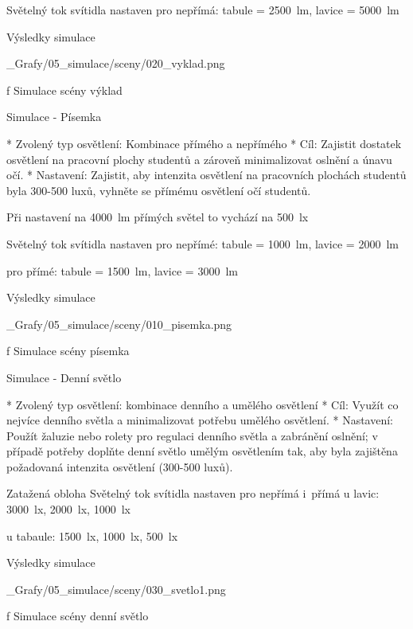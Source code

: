 \noindent Světelný tok svítidla nastaven pro nepřímá: tabule = 2500~lm, lavice = 5000~lm

\secc Výsledky simulace

\medskip {}
\picw=15cm _Grafy/05_simulace/sceny/020_vyklad.png
\caption/f Simulace scény výklad
\medskip

\sec Simulace - Písemka

\begitems
* Zvolený typ osvětlení: Kombinace přímého a nepřímého
* Cíl: Zajistit dostatek osvětlení na pracovní plochy studentů a zároveň minimalizovat oslnění a únavu očí.
* Nastavení: Zajistit, aby intenzita osvětlení na pracovních plochách studentů byla 300-500 luxů, vyhněte se přímému osvětlení očí studentů.
\enditems


\noindent Při nastavení na 4000~lm přímých světel to vychází na 500~lx

\noindent Světelný tok svítidla nastaven pro nepřímé: tabule = 1000~lm, lavice = 2000~lm

pro přímé: tabule = 1500~lm, lavice = 3000~lm

\secc Výsledky simulace

\medskip {}
\picw=15cm _Grafy/05_simulace/sceny/010_pisemka.png
\caption/f Simulace scény písemka
\medskip

\sec Simulace - Denní světlo

\begitems
* Zvolený typ osvětlení: kombinace denního a umělého osvětlení
* Cíl: Využít co nejvíce denního světla a minimalizovat potřebu umělého osvětlení.
* Nastavení: Použít žaluzie nebo rolety pro regulaci denního světla a zabránění oslnění; v případě potřeby doplňte denní světlo umělým osvětlením tak, aby byla zajištěna požadovaná intenzita osvětlení (300-500 luxů).
\enditems

\noindent Zatažená obloha
\noindent Světelný tok svítidla nastaven pro nepřímá i~přímá u lavic: 3000~lx, 2000~lx, 1000~lx

u tabaule: 1500~lx, 1000~lx, 500~lx

\secc Výsledky simulace

\medskip {}
\picw=18cm _Grafy/05_simulace/sceny/030_svetlo1.png
\caption/f Simulace scény denní světlo
\medskip


